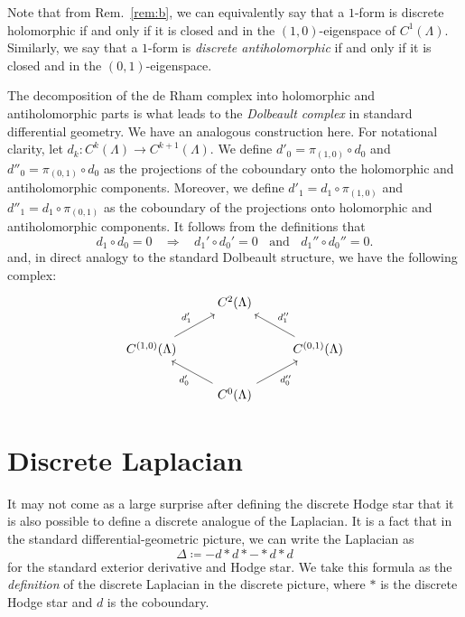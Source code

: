 \documentclass[aps,pra,showpacs,notitlepage,onecolumn,superscriptaddress,nofootinbib]{revtex4-1}
\theoremstyle{definition}
\begin{document}
\noindent Note that from Rem.~\ref{rem:b}, we can equivalently say that a $1$-form is discrete holomorphic if and only if it is closed and in the $(1, 0)$-eigenspace of $C^{1}(\Lambda)$.
Similarly, we say that a $1$-form is \emph{discrete antiholomorphic} if and only if it is closed and in the $(0, 1)$-eigenspace.

The decomposition of the de Rham complex into holomorphic and antiholomorphic parts is what leads to the \emph{Dolbeault complex} in standard differential geometry. We have
an analogous construction here. For notational clarity, let $d_k : C^{k}(\Lambda) \rightarrow C^{k + 1}(\Lambda)$. We define $d'_0 = \pi_{(1, 0)} \circ d_0$ and $d''_0 = \pi_{(0, 1)} \circ d_0$ as the projections of the coboundary
onto the holomorphic and antiholomorphic components. Moreover, we define $d'_1 = d_1 \circ \pi_{(1, 0)}$ and $d''_1 = d_1 \circ \pi_{(0, 1)}$ as the coboundary of the projections onto holomorphic and
antiholomorphic components. It follows from the definitions that
\begin{equation}
  d_1 \circ d_0 = 0 \ \ \ \ \Longrightarrow \ \ \ \ d_1' \circ d_0' = 0 \ \ \ \ \text{and} \ \ \ \ d_1'' \circ d_0'' = 0.
\end{equation}
and, in direct analogy to the standard Dolbeault structure, we have the following complex:
\[\begin{tikzcd}
& {C^2(\Lambda)} \\
	          {C^{(1, 0)}(\Lambda)} && {C^{(0, 1)}(\Lambda)} \\
	          & {C^0(\Lambda)}
	          \arrow["{d_0'}", from=3-2, to=2-1]
	          \arrow["{d_0''}"', from=3-2, to=2-3]
	          \arrow["{d_1'}", from=2-1, to=1-2]
	          \arrow["{d_1''}"', from=2-3, to=1-2]
\end{tikzcd}\]

\section{Discrete Laplacian}

\noindent It may not come as a large surprise after defining the discrete Hodge star that it is also possible to define a discrete analogue of the Laplacian.
It is a fact that in the standard differential-geometric picture, we can write the Laplacian as
\begin{equation}
  \label{eq:lap}
  \Delta \coloneqq -d * d * - * d * d
\end{equation}
for the standard exterior derivative and Hodge star. We take this formula as the \emph{definition} of the discrete Laplacian in the discrete picture, where $*$ is the discrete Hodge star and $d$ is the coboundary.
\end{document}
